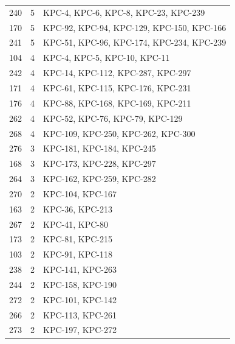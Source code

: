 \begin{longtable}{llp{9cm}}
240 & 5 & KPC-4, KPC-6, KPC-8, KPC-23, KPC-239 \\
170 & 5 & KPC-92, KPC-94, KPC-129, KPC-150, KPC-166 \\
241 & 5 & KPC-51, KPC-96, KPC-174, KPC-234, KPC-239 \\
104 & 4 & KPC-4, KPC-5, KPC-10, KPC-11 \\
242 & 4 & KPC-14, KPC-112, KPC-287, KPC-297 \\
171 & 4 & KPC-61, KPC-115, KPC-176, KPC-231 \\
176 & 4 & KPC-88, KPC-168, KPC-169, KPC-211 \\
262 & 4 & KPC-52, KPC-76, KPC-79, KPC-129 \\
268 & 4 & KPC-109, KPC-250, KPC-262, KPC-300 \\
276 & 3 & KPC-181, KPC-184, KPC-245 \\
168 & 3 & KPC-173, KPC-228, KPC-297 \\
264 & 3 & KPC-162, KPC-259, KPC-282 \\
270 & 2 & KPC-104, KPC-167 \\
163 & 2 & KPC-36, KPC-213 \\
267 & 2 & KPC-41, KPC-80 \\
173 & 2 & KPC-81, KPC-215 \\
103 & 2 & KPC-91, KPC-118 \\
238 & 2 & KPC-141, KPC-263 \\
244 & 2 & KPC-158, KPC-190 \\
272 & 2 & KPC-101, KPC-142 \\
266 & 2 & KPC-113, KPC-261 \\
273 & 2 & KPC-197, KPC-272 \\
\end{longtable}
